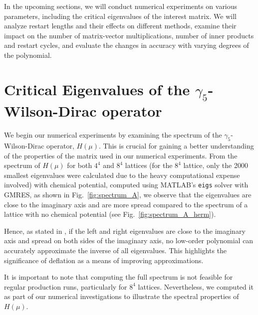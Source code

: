 
In the upcoming sections, we will conduct numerical experiments on various parameters, including the critical eigenvalues of the interest matrix. We will analyze restart lengths and their effects on different methods, examine their impact on the number of matrix-vector multiplications, number of inner products and restart cycles, and evaluate the changes in accuracy with varying degrees of the polynomial.

\section{Critical Eigenvalues of the $\gamma_5$-Wilson-Dirac operator}
\label{sec:crit_eig_wil_dirac_oper}

We begin our numerical experiments by examining the spectrum of the \(\gamma_5\)-Wilson-Dirac operator, \(H(\mu)\). This is crucial for gaining a better understanding of the properties of the matrix used in our numerical experiments. From the spectrum of \(H(\mu)\) for both \(4^4\) and \(8^4\) lattices (for the \(8^4\) lattice, only the 2000 smallest eigenvalues were calculated due to the heavy computational expense involved) with chemical potential, computed using MATLAB’s \texttt{eigs} solver with GMRES, as shown in Fig.~\ref{fig:spectrum_A}, we observe that the eigenvalues are close to the imaginary axis and are more spread compared to the spectrum of a lattice with no chemical potential (see Fig.~\ref{fig:spectrum_A_herm}).

Hence, as stated in \cite{11}, if the left and right eigenvalues are close to the imaginary axis and spread on both sides of the imaginary axis, no low-order polynomial can accurately approximate the inverse of all eigenvalues. This highlights the significance of deflation as a means of improving approximations.

It is important to note that computing the full spectrum is not feasible for regular production runs, particularly for $8^4$ lattices. Nevertheless, we computed it as part of our numerical investigations to illustrate the spectral properties of $H(\mu)$.

